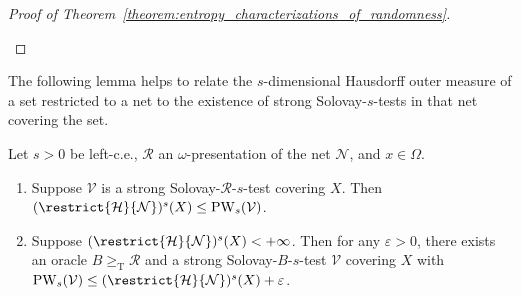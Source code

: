 \begin{proof}[Proof of Theorem~\ref{theorem:entropy_characterizations_of_randomness}]
\begin{enumerate}[label = (\roman*)]
    \end{enumerate}
\end{proof}

The following lemma helps to relate the $s$-dimensional Hausdorff outer measure of a set restricted to a net to the existence of strong Solovay-$s$-tests in that net covering the set.

\begin{lemma}
    Let $s > 0$ be left-c.e., $\mathscr{R}$ an $\omega$-presentation of the net $\mathcal{N}$, and $x \in \Omega$.  
    \label{lemma:strong_Solovay_test_vs_s_measure}
    \begin{enumerate}[label = (\roman*)]
        \item Suppose $\mathcal{V}$ is a strong Solovay-$\mathscr{R}$-$s$-test covering $X$. Then $(\restrict{\mathcal{H}}{\mathcal{N}})^s(X) \leq \operatorname{PW}_s(\mathcal{V})$. 
        \item Suppose $(\restrict{\mathcal{H}}{\mathcal{N}})^s(X) < + \infty$. Then for any $\varepsilon > 0$, there exists an oracle $B \geq_{\operatorname{T}} \mathscr{R}$ and a strong Solovay-$B$-$s$-test $\mathcal{V}$ covering $X$ with $\operatorname{PW}_s(\mathcal{V}) \leq (\restrict{\mathcal{H}}{\mathcal{N}})^s(X) + \varepsilon$. 
    \end{enumerate}
\end{lemma}
